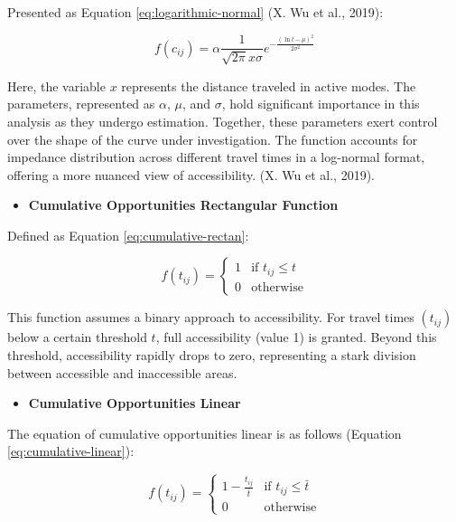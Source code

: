 \documentclass[
11pt, %
oneside, %
english, %
singlespacing, %
]{macthesis} %
\def\tightlist{}
\begin{document}
Presented as Equation \ref{eq:logarithmic-normal} (X. Wu et al., 2019):

\begin{equation}
f(c_{ij}) = \alpha \frac{1}{\sqrt{2\pi} x \sigma} e^{-\frac{(\ln t - \mu)^2}{2\sigma^2}}
\label{eq:logarithmic-normal}
\end{equation}

Here, the variable \(x\) represents the distance traveled in active modes. The parameters, represented as \(\alpha\), \(\mu\), and \(\sigma\), hold significant importance in this analysis as they undergo estimation. Together, these parameters exert control over the shape of the curve under investigation. The function accounts for impedance distribution across different travel times in a log-normal format, offering a more nuanced view of accessibility. (X. Wu et al., 2019).

\begin{itemize}
\tightlist
\item
  \textbf{Cumulative Opportunities Rectangular Function}
\end{itemize}

Defined as Equation \ref{eq:cumulative-rectan}:

\begin{equation}
f(t_{ij}) =
\begin{cases}
  1 & \text{if } t_{ij} \le t \\
  0 & \text{otherwise}
\end{cases}
\label{eq:cumulative-rectan}
\end{equation}

This function assumes a binary approach to accessibility. For travel times \((t_{ij})\) below a certain threshold \(t\), full accessibility (value 1) is granted. Beyond this threshold, accessibility rapidly drops to zero, representing a stark division between accessible and inaccessible areas.

\begin{itemize}
\tightlist
\item
  \textbf{Cumulative Opportunities Linear}
\end{itemize}

The equation of cumulative opportunities linear is as follows (Equation \ref{eq:cumulative-linear}):

\begin{equation}
f(t_{ij}) =
\begin{cases}
  1 - \frac{t_{ij}}{\bar{t}} & \text{if } t_{ij} \le \bar{t} \\
  0 & \text{otherwise}
\end{cases}
\label{eq:cumulative-linear}
\end{equation}
\end{document}
